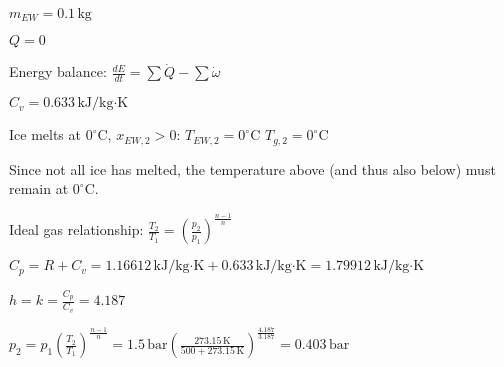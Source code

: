 \( m_{EW} = 0.1 \, \text{kg} \)  

\( Q = 0 \)  

Energy balance:  
\( \frac{dE}{dt} = \sum \dot{Q} - \sum \dot{\omega} \)  

\( C_v = 0.633 \, \text{kJ/kg·K} \)  

Ice melts at \( 0^\circ \text{C} \), \( x_{EW,2} > 0 \):  
\( T_{EW,2} = 0^\circ \text{C} \)  
\( T_{g,2} = 0^\circ \text{C} \)  

Since not all ice has melted, the temperature above (and thus also below) must remain at \( 0^\circ \text{C} \).  

Ideal gas relationship:  
\( \frac{T_2}{T_1} = \left( \frac{p_2}{p_1} \right)^{\frac{n-1}{n}} \)  

\( C_p = R + C_v = 1.16612 \, \text{kJ/kg·K} + 0.633 \, \text{kJ/kg·K} = 1.79912 \, \text{kJ/kg·K} \)  

\( h = k = \frac{C_p}{C_v} = 4.187 \)  

\( p_2 = p_1 \left( \frac{T_2}{T_1} \right)^{\frac{n-1}{n}} = 1.5 \, \text{bar} \left( \frac{273.15 \, \text{K}}{500 + 273.15 \, \text{K}} \right)^{\frac{4.187}{3.187}} = 0.403 \, \text{bar} \)